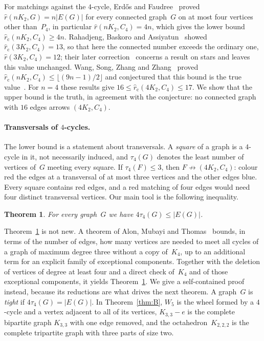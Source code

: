 \documentclass[11pt,letterpaper]{article}
\numberwithin{equation}{section}
\theoremstyle{plain}
\newtheorem{mainthm}{Theorem}
\theoremstyle{definition}
\theoremstyle{remark}
\newcommand{\Kme}{K_{3,3}-e}
\newcommand{\Oct}{K_{2,2,2}}
\newcommand{\rc}{\hat r_{\mathrm{c}}}
\begin{document}
For matchings against the $4$-cycle, Erd\H{o}s and Faudree~\cite[Theorem~3]{EF84} proved $\hat r(nK_2,G)=n|E(G)|$ for every connected graph~$G$ on at most four vertices other than~$P_4$, in particular $\hat r(nK_2,C_4)=4n$, which gives the lower bound $\rc(nK_2,C_4)\ge4n$. Rahadjeng, Baskoro and Assiyatun~\cite[Lemma~2.4]{RBA17} showed $\rc(3K_2,C_4)=13$, so that here the connected number exceeds the ordinary one, $\hat r(3K_2,C_4)=12$; their later correction~\cite{RBA18} concerns a result on stars and leaves this value unchanged. Wang, Song, Zhang and Zhang~\cite[Theorem~1.3]{WSZZ25} proved $\rc(nK_2,C_4)\le\lfloor(9n-1)/2\rfloor$ and conjectured that this bound is the true value~\cite[Conjecture~1]{WSZZ25}. For $n=4$ these results give $16\le\rc(4K_2,C_4)\le17$. We show that the upper bound is the truth, in agreement with the conjecture: no connected graph with $16$ edges arrows $(4K_2,C_4)$.

\paragraph{Transversals of $4$-cycles.} The lower bound is a statement about transversals. A \emph{square} of a graph is a $4$-cycle in it, not necessarily induced, and $\tau_4(G)$ denotes the least number of vertices of~$G$ meeting every square. If $\tau_4(F)\le3$, then $F\not\to(4K_2,C_4)$: colour red the edges at a transversal of at most three vertices and the other edges blue. Every square contains red edges, and a red matching of four edges would need four distinct transversal vertices. Our main tool is the following inequality.

\begin{mainthm}\label{thm:A}
For every graph~$G$ we have $4\tau_4(G)\le|E(G)|$.
\end{mainthm}

Theorem~\ref{thm:A} is not new. A theorem of Alon, Mubayi and Thomas~\cite[Theorem~1.5]{AMT01} bounds, in terms of the number of edges, how many vertices are needed to meet all cycles of a graph of maximum degree three without a copy of~$K_4$, up to an additional term for an explicit family of exceptional components. Together with the deletion of vertices of degree at least four and a direct check of~$K_4$ and of those exceptional components, it yields Theorem~\ref{thm:A}. We give a self-contained proof instead, because its reductions are what drives the next theorem. A graph~$G$ is \emph{tight} if $4\tau_4(G)=|E(G)|$. In Theorem~\ref{thm:B}, $W_5$ is the wheel formed by a $4$-cycle and a vertex adjacent to all of its vertices, $\Kme$ is the complete bipartite graph $K_{3,3}$ with one edge removed, and the octahedron~$\Oct$ is the complete tripartite graph with three parts of size two.
\end{document}
